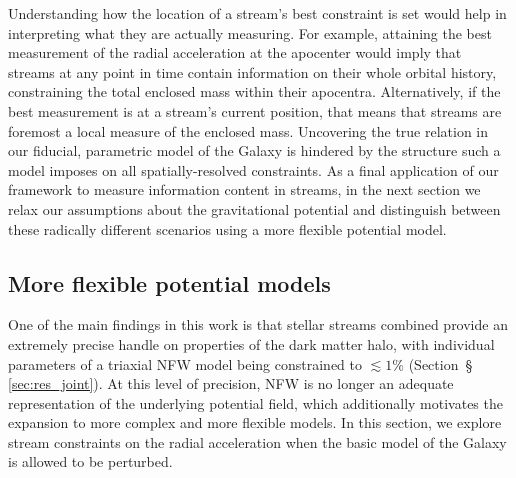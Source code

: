 \documentclass[modern]{aastex61}
\begin{document}
Understanding how the location of a stream's best constraint is set would help in interpreting what they are actually measuring.
For example, attaining the best measurement of the radial acceleration at the apocenter would imply that streams at any point in time contain information on their whole orbital history, constraining the total enclosed mass within their apocentra.
Alternatively, if the best measurement is at a stream's current position, that means that streams are foremost a local measure of the enclosed mass.
Uncovering the true relation in our fiducial, parametric model of the Galaxy is hindered by the structure such a model imposes on all spatially-resolved constraints.
As a final application of our framework to measure information content in streams, in the next section we relax our assumptions about the gravitational potential and distinguish between these radically different scenarios using a more flexible potential model.


\subsection{More flexible potential models}
\label{sec:bfe}
One of the main findings in this work is that stellar streams combined provide an extremely precise handle on properties of the dark matter halo, with individual parameters of a triaxial NFW model being constrained to $\lesssim1\%$ (Section~\S\,\ref{sec:res_joint}).
At this level of precision, NFW is no longer an adequate representation of the underlying potential field, which additionally motivates the expansion to more complex and more flexible models.
In this section, we explore stream constraints on the radial acceleration when the basic model of the Galaxy is allowed to be perturbed.
\end{document}
